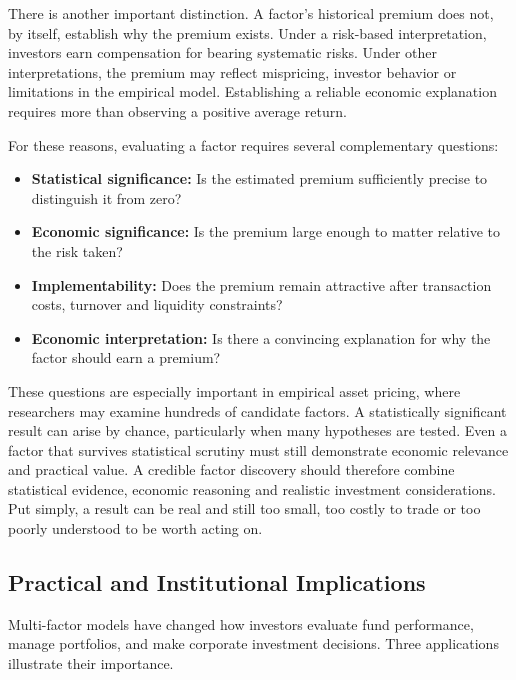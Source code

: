 There is another important distinction. A factor's historical premium does not, by itself, establish why the premium exists. Under a risk-based interpretation, investors earn compensation for bearing systematic risks. Under other interpretations, the premium may reflect mispricing, investor behavior or limitations in the empirical model. Establishing a reliable economic explanation requires more than observing a positive average return.

For these reasons, evaluating a factor requires several complementary questions:

\begin{itemize}
  \item \textbf{Statistical significance:} Is the estimated premium sufficiently precise to distinguish it from zero?
  \item \textbf{Economic significance:} Is the premium large enough to matter relative to the risk taken?
  \item \textbf{Implementability:} Does the premium remain attractive after transaction costs, turnover and liquidity constraints?
  \item \textbf{Economic interpretation:} Is there a convincing explanation for why the factor should earn a premium?
\end{itemize}

These questions are especially important in empirical asset pricing, where researchers may examine hundreds of candidate factors. A statistically significant result can arise by chance, particularly when many hypotheses are tested. Even a factor that survives statistical scrutiny must still demonstrate economic relevance and practical value. A credible factor discovery should therefore combine statistical evidence, economic reasoning and realistic investment considerations. Put simply, a result can be real and still too small, too costly to trade or too poorly understood to be worth acting on.


\subsection{Practical and Institutional Implications}
\label{sec:04-implications}

Multi-factor models have changed how investors evaluate fund
performance, manage portfolios, and make corporate investment
decisions. Three applications illustrate their importance.

